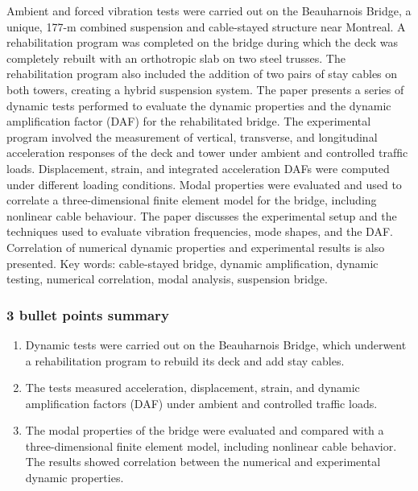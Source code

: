 \documentclass[
  letterpaper,
  DIV=11,
  numbers=noendperiod]{scrreprt}
\providecommand{\tightlist}{%
  \setlength{\itemsep}{0pt}\setlength{\parskip}{0pt}}\usepackage{longtable,booktabs,array}
\begin{document}
Ambient and forced vibration tests were carried out on the Beauharnois
Bridge, a unique, 177-m combined suspension and cable-stayed structure
near Montreal. A rehabilitation program was completed on the bridge
during which the deck was completely rebuilt with an orthotropic slab on
two steel trusses. The rehabilitation program also included the addition
of two pairs of stay cables on both towers, creating a hybrid suspension
system. The paper presents a series of dynamic tests performed to
evaluate the dynamic properties and the dynamic ampliﬁcation factor
(DAF) for the rehabilitated bridge. The experimental program involved
the measurement of vertical, transverse, and longitudinal acceleration
responses of the deck and tower under ambient and controlled trafﬁc
loads. Displacement, strain, and integrated acceleration DAFs were
computed under different loading conditions. Modal properties were
evaluated and used to correlate a three-dimensional ﬁnite element model
for the bridge, including nonlinear cable behaviour. The paper discusses
the experimental setup and the techniques used to evaluate vibration
frequencies, mode shapes, and the DAF. Correlation of numerical dynamic
properties and experimental results is also presented. Key words:
cable-stayed bridge, dynamic ampliﬁcation, dynamic testing, numerical
correlation, modal analysis, suspension bridge.

\hypertarget{bullet-points-summary-9}{%
\subsubsection{3 bullet points summary}\label{bullet-points-summary-9}}

\begin{enumerate}
\def\labelenumi{\arabic{enumi}.}
\tightlist
\item
  Dynamic tests were carried out on the Beauharnois Bridge, which
  underwent a rehabilitation program to rebuild its deck and add stay
  cables.
\item
  The tests measured acceleration, displacement, strain, and dynamic
  amplification factors (DAF) under ambient and controlled traffic
  loads.
\item
  The modal properties of the bridge were evaluated and compared with a
  three-dimensional finite element model, including nonlinear cable
  behavior. The results showed correlation between the numerical and
  experimental dynamic properties.
\end{enumerate}
\end{document}
